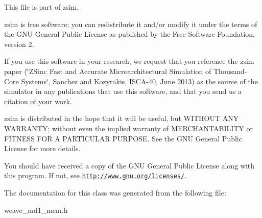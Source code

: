 This file is part of zsim.

zsim is free software; you can redistribute it and/or modify it under the terms of the G\-N\-U General Public License as published by the Free Software Foundation, version 2.

If you use this software in your research, we request that you reference the zsim paper (\char`\"{}\-Z\-Sim\-: Fast and Accurate Microarchitectural Simulation of
\-Thousand-\/\-Core Systems\char`\"{}, Sanchez and Kozyrakis, I\-S\-C\-A-\/40, June 2013) as the source of the simulator in any publications that use this software, and that you send us a citation of your work.

zsim is distributed in the hope that it will be useful, but W\-I\-T\-H\-O\-U\-T A\-N\-Y W\-A\-R\-R\-A\-N\-T\-Y; without even the implied warranty of M\-E\-R\-C\-H\-A\-N\-T\-A\-B\-I\-L\-I\-T\-Y or F\-I\-T\-N\-E\-S\-S F\-O\-R A P\-A\-R\-T\-I\-C\-U\-L\-A\-R P\-U\-R\-P\-O\-S\-E. See the G\-N\-U General Public License for more details.

You should have received a copy of the G\-N\-U General Public License along with this program. If not, see \href{http://www.gnu.org/licenses/}{\tt http\-://www.\-gnu.\-org/licenses/}. 

The documentation for this class was generated from the following file\-:\begin{DoxyCompactItemize}
\item 
weave\-\_\-md1\-\_\-mem.\-h\end{DoxyCompactItemize}
